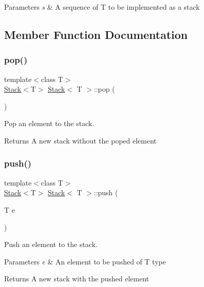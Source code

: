 \begin{DoxyParams}{Parameters}
{\em s} & A sequence of T to be implemented as a stack \\
\hline
\end{DoxyParams}


\subsection{Member Function Documentation}
\mbox{\label{class_stack_a79085ca78d75f61838c1c2b8f9de968d}} 
\subsubsection{\texorpdfstring{pop()}{pop()}}
{\footnotesize\ttfamily template$<$class T$>$ \\
\hyperlink{class_stack}{Stack}$<$T$>$ \hyperlink{class_stack}{Stack}$<$ T $>$\+::pop (\begin{DoxyParamCaption}{ }\end{DoxyParamCaption})}



Pop an element to the stack. 

\begin{DoxyReturn}{Returns}
A new stack without the poped element 
\end{DoxyReturn}
\mbox{\label{class_stack_a2f702496e109485c2ce9261f0c629dd1}} 
\subsubsection{\texorpdfstring{push()}{push()}}
{\footnotesize\ttfamily template$<$class T$>$ \\
\hyperlink{class_stack}{Stack}$<$T$>$ \hyperlink{class_stack}{Stack}$<$ T $>$\+::push (\begin{DoxyParamCaption}\item[{T}]{e }\end{DoxyParamCaption})}



Push an element to the stack. 


\begin{DoxyParams}{Parameters}
{\em e} & An element to be pushed of T type \\
\hline
\end{DoxyParams}
\begin{DoxyReturn}{Returns}
A new stack with the pushed element 
\end{DoxyReturn}
\mbox{\label{class_stack_a6aad92f7dc41a4dcd858bb4ff1f96cec}} 
